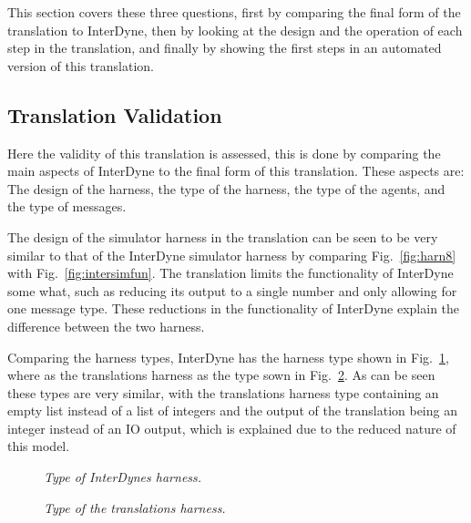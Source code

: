 \documentclass{article}
\begin{document}
This section covers these three questions, first by comparing the final form of the translation to InterDyne, then by looking at the design and the operation of each step in the translation, and finally by showing the first steps in an automated version of this translation.  


\subsection{Translation Validation}
Here the validity of this translation is assessed, this is done by comparing the main aspects of InterDyne to the final form of this translation. These aspects are: The design of the harness, the type of the harness, the type of the agents, and the type of messages. 

The design of the simulator harness in the translation can be seen to be very similar to that of the InterDyne simulator harness by comparing Fig.~\ref{fig:harn8} with Fig.~\ref{fig:intersimfun}. The translation limits the functionality of InterDyne some what, such as reducing its output to a single number and only allowing for one message type. These reductions in the functionality of InterDyne explain the difference between the two harness.

Comparing the harness types, InterDyne has the harness type shown in Fig.~\ref{fig:harntypint}, where as the translations harness as the type sown in Fig.~\ref{fig:harntyptrans}. As can be seen these types are very similar, with the translations harness type containing an empty list instead of a list of integers and the output of the translation being an integer instead of an IO output, which is explained due to the reduced nature of this model. 
\begin{figure}[H]
	\centering
	
	\caption{\it Type of InterDynes harness.}
	\label{fig:harntypint}
\end{figure} 
\begin{figure}[H]
	\centering
	
	\caption{\it Type of the translations harness.}
	\label{fig:harntyptrans}
\end{figure} 
\end{document}
